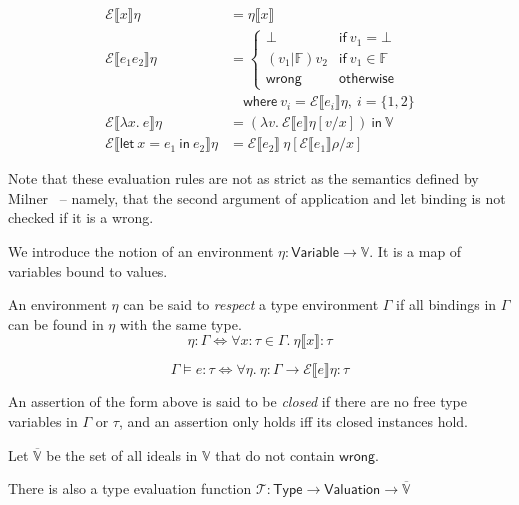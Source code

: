 \begin{align*}
  \mathcal{E} \llbracket x \rrbracket \eta
  &= \eta \llbracket x \rrbracket \\
  \mathcal{E} \llbracket e_1 e_2 \rrbracket \eta
  &=
    \begin{cases}
      \bot & \mathsf{if} \ v_1 = \bot \\
      (v_1 | \mathbb{F}) v_2 & \mathsf{if} \ v_1 \in \mathbb{F} \\
      \mathsf{wrong} & \mathsf{otherwise}
    \end{cases}
  \\
  & \quad \textsf{where} \ v_i = \mathcal{E} \llbracket e_i \rrbracket \eta , \ i = \{
    1, 2\} \\
  \mathcal{E} \llbracket \lambda x . \ e \rrbracket \eta
  &=
    (\lambda v . \ \mathcal{E} \llbracket e \rrbracket \eta [v / x ])
    \ \mathsf{in} \ \mathbb{V} \\
  \mathcal{E} \llbracket \textsf{let} \ x = e_1 \ \textsf{in} \ e_2 \rrbracket \eta
  &=
    \mathcal{E} \llbracket e_2 \rrbracket \ \eta [ \mathcal{E} \llbracket e_1 \rrbracket\rho / x ]
\end{align*}

Note that these evaluation rules are not as strict as the semantics
defined by Milner~\cite{milner1978} -- namely, that the second argument
of application and let binding is not checked if it is a \textsf{wrong}.

We introduce the notion of an environment $\eta : \mathsf{Variable} \rightarrow
\mathbb{V}$. It is a map of variables bound to values.

An environment $\eta$ can be said to \textit{respect} a type environment
$\Gamma$ if all bindings in $\Gamma$ can be found in $\eta$ with the same type.
$$\eta : \Gamma \iff \forall x : \tau \in \Gamma. \ \eta \llbracket x \rrbracket : \tau$$

$$\Gamma \vDash e : \tau \iff
\forall \eta. \ \eta : \Gamma \rightarrow \mathcal{E} \llbracket e \rrbracket \eta : \tau $$

An assertion of the form above is said to be \textit{closed} if there
are no free type variables in $\Gamma$ or $\tau$, and an assertion only holds
iff its closed instances hold.

Let $\overline{\mathbb{V}}$ be the set of all ideals in $\mathbb{V}$
that do not contain $\mathsf{wrong}$.

There is also a type evaluation function $\mathcal{T} : \mathsf{Type}
\rightarrow \mathsf{Valuation} \rightarrow \overline{\mathbb{V}}$

